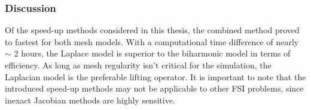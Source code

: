 \subsubsection{Discussion}
Of the speed-up methods considered in this thesis, the combined method proved to fastest for both mesh models. With a computational time difference of nearly $\sim$ 2 hours, the Laplace model is superior to the biharmonic model in terms of efficiency. As long as mesh regularity isn't critical for the simulation, the Laplacian model is the preferable lifting operator. It is important to note that the introduced speed-up methods may not be applicable to other FSI problems, since inexact Jacobian methods are highly sensitive. 
